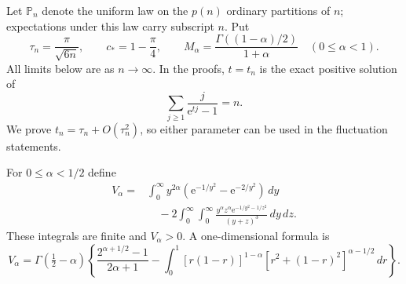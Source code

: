 \documentclass[11pt,letterpaper]{article}
\numberwithin{equation}{section}
\theoremstyle{definition}\newtheorem{definition}[theorem]{Definition}
\theoremstyle{remark}\newtheorem{remark}[theorem]{Remark}
\newcommand{\ee}{\mathrm e}
\newcommand{\Pp}{\mathbb P}
\begin{document}
Let $\Pp_n$ denote the uniform law on the $p(n)$ ordinary partitions of
$n$; expectations under this law carry subscript $n$. Put
\begin{equation}\label{dmv:fl:eq:tau}
 \tau_n=\frac{\pi}{\sqrt{6n}},\qquad
 c_* =1-\frac\pi4,\qquad
 M_\alpha=\frac{\Gamma((1-\alpha)/2)}{1+\alpha}
 \quad(0\le\alpha<1).
\end{equation}
All limits below are as $n\to\infty$. In the proofs, $t=t_n$ is the exact
positive solution of
\begin{equation}\label{dmv:fl:eq:saddle}
 \sum_{j\ge1}\frac{j}{\ee^{tj}-1}=n.
\end{equation}
We prove $t_n=\tau_n+O(\tau_n^2)$, so either parameter can be used in
the fluctuation statements.

For $0\le\alpha<1/2$ define
\begin{align}\label{dmv:fl:eq:Va}
 V_\alpha={}&\int_0^\infty y^{2\alpha}
       (\ee^{-1/y^2}-\ee^{-2/y^2})\,dy\\
 &\quad-2\int_0^\infty\int_0^\infty
       \frac{y^\alpha z^\alpha\ee^{-1/y^2-1/z^2}}{(y+z)^3}\,dy\,dz.
 \nonumber
\end{align}
These integrals are finite and $V_\alpha>0$. A one-dimensional formula is
\begin{equation}\label{dmv:fl:eq:Vaoned}
 V_\alpha=\Gamma(\tfrac12-\alpha)
 \left\{\frac{2^{\alpha+1/2}-1}{2\alpha+1}
 -\int_0^1[r(1-r)]^{1-\alpha}
       [r^2+(1-r)^2]^{\alpha-1/2}\,dr\right\}.
\end{equation}
\end{document}
